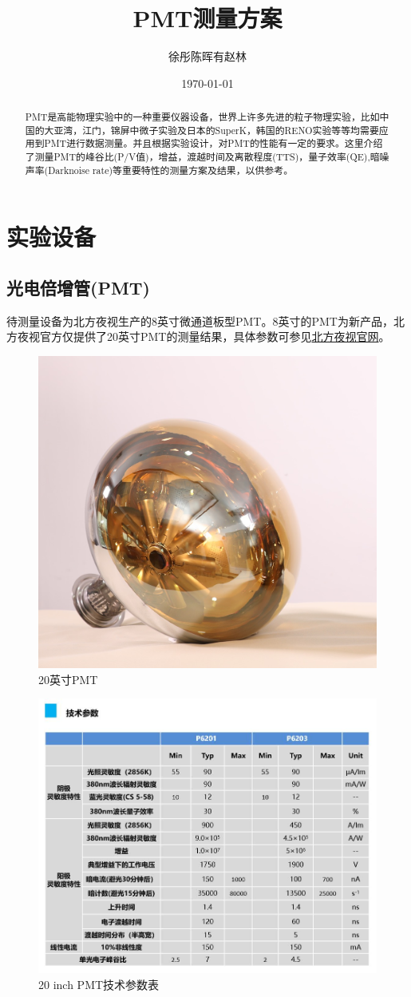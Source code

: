 \documentclass[UTF8,a4paper,12pt]{ctexart}
\title{\textbf{\Large{PMT测量方案}}}
\author{ 徐彤\quad 陈晖有\quad 赵林 }
\date{\today}
\begin{document}
 
\maketitle
 
\begin{abstract}
PMT是高能物理实验中的一种重要仪器设备，世界上许多先进的粒子物理实验，比如中国的大亚湾，江门，锦屏中微子实验及日本的SuperK，韩国的RENO实验等等均需要应用到PMT进行数据测量。并且根据实验设计，对PMT的性能有一定的要求。这里介绍了测量PMT的峰谷比(P/V值)，增益，渡越时间及离散程度(TTS)，量子效率(QE),暗噪声率(Darknoise rate)等重要特性的测量方案及结果，以供参考。
\end{abstract}
 
\section{\textbf{实验设备}}
\subsection{光电倍增管(PMT)}
待测量设备为北方夜视生产的8英寸微通道板型PMT。8英寸的PMT为新产品，北方夜视官方仅提供了20英寸PMT的测量结果，具体参数可参见\href{http://ysgf.norincogroup.com.cn/art/2020/3/23/art_1235_25349.html}{北方夜视官网}。
\begin{figure}[H]
	\centering
	\includegraphics[width=0.5\linewidth]{20inch_PMT}
	\caption[图1]{20英寸PMT}
\end{figure}
\begin{figure}[H]
	\centering
	\includegraphics[width=0.8\linewidth]{技术参数}
	\caption[图2]{20 inch PMT技术参数表}
\end{figure}
\end{document}

